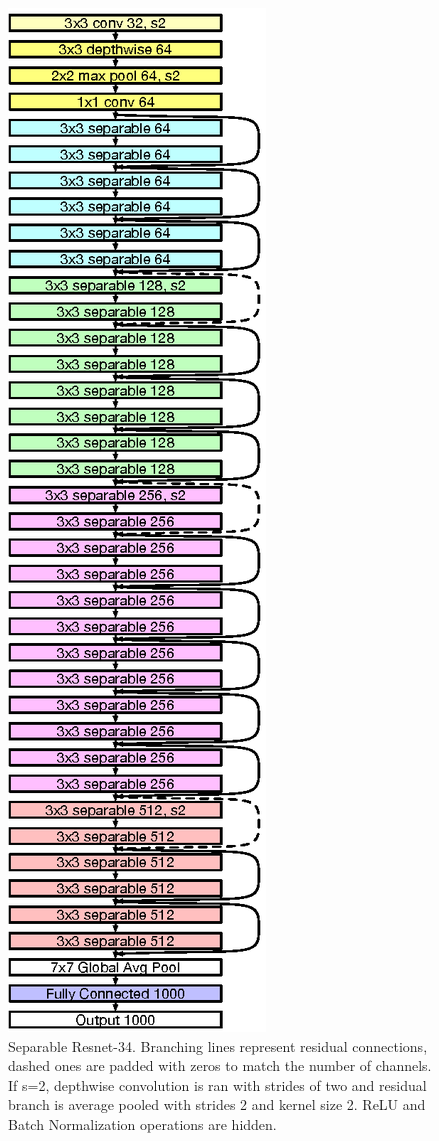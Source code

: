 \begin{figure}
\vspace{-65px}
  \begin{center}
        \includegraphics{images/separable_resnet.eps}
  \end{center}
  \caption{Separable Resnet-34. Branching lines represent residual connections, dashed ones are padded with zeros to match the number of channels. If s=2, depthwise convolution is ran with strides of two and residual branch is average pooled with strides 2 and kernel size 2. ReLU and Batch Normalization operations are hidden.}
  \label{fig:model}
\end{figure}

